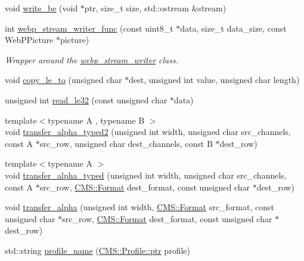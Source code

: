 \begin{DoxyCompactItemize}
void \hyperlink{namespace_photo_finish_a7c41a48ae64ffaae2d2514c7c713d171}{write\+\_\+be} (void $\ast$ptr, size\+\_\+t size, std\+::ostream \&stream)
\item 
int \hyperlink{namespace_photo_finish_a1e5838b47b653916bf48abe8aae872ec}{webp\+\_\+stream\+\_\+writer\+\_\+func} (const uint8\+\_\+t $\ast$data, size\+\_\+t data\+\_\+size, const Web\+P\+Picture $\ast$picture)
\begin{DoxyCompactList}\small\item\em Wrapper around the \hyperlink{class_photo_finish_1_1webp__stream__writer}{webp\+\_\+stream\+\_\+writer} class. \end{DoxyCompactList}\item 
void \hyperlink{namespace_photo_finish_a768e4da23a5f8e540e63856631c5e036}{copy\+\_\+le\+\_\+to} (unsigned char $\ast$dest, unsigned int value, unsigned char length)
\item 
unsigned int \hyperlink{namespace_photo_finish_a4c7726ccf8c39b9b415203df8a2cdbe9}{read\+\_\+le32} (const unsigned char $\ast$data)
\item 
{\footnotesize template$<$typename A , typename B $>$ }\\void \hyperlink{namespace_photo_finish_ace71473b76f98f3b7b124f13e4b0a52a}{transfer\+\_\+alpha\+\_\+typed2} (unsigned int width, unsigned char src\+\_\+channels, const A $\ast$src\+\_\+row, unsigned char dest\+\_\+channels, const B $\ast$dest\+\_\+row)
\item 
{\footnotesize template$<$typename A $>$ }\\void \hyperlink{namespace_photo_finish_a2e770f57d0b1dab1f2dc51c2fc7d8d55}{transfer\+\_\+alpha\+\_\+typed} (unsigned int width, unsigned char src\+\_\+channels, const A $\ast$src\+\_\+row, \hyperlink{class_c_m_s_1_1_format}{C\+M\+S\+::\+Format} dest\+\_\+format, const unsigned char $\ast$dest\+\_\+row)
\item 
void \hyperlink{namespace_photo_finish_aeabb5e211b3ca0e80d736b002a73d534}{transfer\+\_\+alpha} (unsigned int width, \hyperlink{class_c_m_s_1_1_format}{C\+M\+S\+::\+Format} src\+\_\+format, const unsigned char $\ast$src\+\_\+row, \hyperlink{class_c_m_s_1_1_format}{C\+M\+S\+::\+Format} dest\+\_\+format, const unsigned char $\ast$dest\+\_\+row)
\item 
std\+::string \hyperlink{namespace_photo_finish_aada30164b0a54eded5ba1f7c5a92636a}{profile\+\_\+name} (\hyperlink{class_c_m_s_1_1_profile_a7d5a80e1317d17dbfdf5ae69820ab08b}{C\+M\+S\+::\+Profile\+::ptr} profile)
\item 

\end{DoxyCompactItemize}
